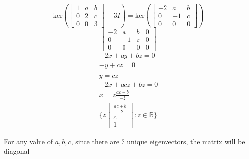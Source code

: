 \documentclass[hidelinks]{article}
\begin{document}
\[
	\text{ker}(\begin{bmatrix} 1 & a & b \\ 0 & 2 & c \\ 0 & 0 & 3\end{bmatrix} - 3I) = \text{ker}(\begin{bmatrix} -2 & a & b \\ 0 & -1 & c \\ 0 & 0 & 0\end{bmatrix}) 
\]
\[
	\begin{bmatrix} -2 & a & b & 0 \\ 0 & -1 & c & 0\\ 0 & 0 & 0 & 0\end{bmatrix}
\]
\begin{align*}
	-2x + ay +bz = 0 \\
	-y + cz = 0 \\\\
	y = cz \\
	-2x + acz + bz = 0 \\
	x = z\frac{ac + b}{-2} \\
	\{z \begin{bmatrix} \frac{ac + b}{-2} \\ c \\  1 \end{bmatrix} : z \in \mathbb{R}\}
\end{align*}

For any value of $a, b, c$, since there are 3 unique eigenvectors, the matrix will be diagonal
\end{document}
